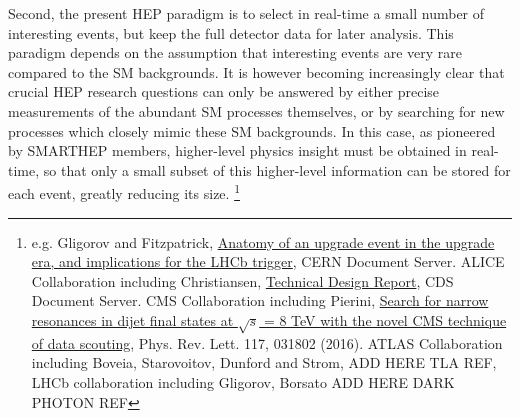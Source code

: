 Second, the present HEP paradigm is to select in real-time a small number of interesting events, but keep the full detector data for later analysis. This paradigm depends on the assumption that interesting events are very rare compared to the SM backgrounds. It is however becoming increasingly clear that crucial HEP research questions can only be answered by either precise measurements of the abundant SM processes themselves, or by searching for new processes which closely mimic these SM backgrounds. In this case, as pioneered by SMARTHEP members, higher-level physics insight must be obtained in real-time, so that only a small subset of this higher-level information can be stored for each event, greatly reducing its size.
\footnote{e.g. Gligorov and Fitzpatrick, \href{http://cds.cern.ch/record/1670985}{Anatomy of an upgrade event in the upgrade era, and implications for the LHCb trigger}, CERN Document Server. ALICE Collaboration including Christiansen, \href{https://cds.cern.ch/record/2011297/files/ALICE-TDR-019.pdf}{Technical Design Report}, CDS Document Server. CMS Collaboration including Pierini, \href{https://arxiv.org/abs/1604.08907}{Search for narrow resonances in dijet final states at $\sqrt{s}$ = 8 TeV with the novel CMS technique of data scouting}, Phys. Rev. Lett. 117, 031802 (2016). ATLAS Collaboration including Boveia, Starovoitov, Dunford and Strom, ADD HERE TLA REF, LHCb collaboration including Gligorov, Borsato ADD HERE DARK PHOTON REF}
